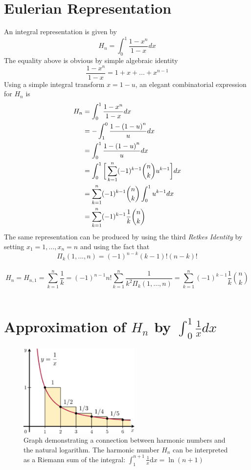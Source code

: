 \documentclass[2pt]{article}
\begin{document}
\section{Eulerian Representation}
An integral representation is given by
\begin{equation}
H_{n} = \int_{0}^{1} \frac{1-x^n}{1-x} dx \label{Euler equation}\nonumber
\end{equation}
The equality above is obvious by simple algebraic identity
\begin{equation}
\frac{1-x^n}{1-x} = 1+x+...+x^{n-1}\nonumber
\end{equation}
Using a simple integral transform ${x = 1-u}$, an elegant combinatorial expression for $H_{n}$ is\\
\begin{align}
H_{n} &= \int_{0}^{1} \frac{1-x^n}{1-x} dx\nonumber \\
	 &= -\int_{1}^{0} \frac{1-{(1-u)}^n}{u} dx \nonumber \\
	 &= \int_{0}^{1} \frac{1-{(1-u)}^n}{u} dx \nonumber \\
	 &= \int_{0}^{1} \bigg{[}\sum_{k=1}^{n} (-1)^{k-1} {n \choose k} u^{k-1}\bigg{]}dx \nonumber \\
	 &= \sum_{k=1}^{n} (-1)^{k-1} {n \choose k} \int_{0}^{1} u^{k-1} \nonumber dx\\
	 &= \sum_{k=1}^{n} (-1)^{k-1} \frac{1}{k} {n \choose k} \nonumber
\end{align}
The same representation can be produced by using the third \emph{Retkes Identity} by setting $x_{1} = 1, . . . , x_{n} = n$ and using the fact that
\begin{equation}
{\Pi}_{k}(1, . . . , n) = {(-1)}^{n-k} (k-1)!(n-k)! \nonumber
\end{equation}
\\
\begin{equation}
H_{n}=H_{n,1}=\sum_{k=1}^{n} \frac{1}{k} = {(-1)}^{n-1}n!\sum_{k=1}^{n}\frac{1}{k^{2}{\Pi}_{k}(1, . . . ,n)}=\sum_{k=1}^{n}{(-1)}^{k-1}\frac{1}{k}{n \choose k} \nonumber
\end{equation}
\\
\section{Approximation of $H_{n}$ by $\int_{0}^{1}\frac{1}{x} dx$}
\begin{figure}
\includegraphics[width=6cm, natwidth=570, natheight=436]{2.eps}
\caption{\small{Graph demonstrating a connection between harmonic numbers and the natural logarithm. The harmonic number $H_{n}$ can be interpreted as a Riemann sum of the integral: $\int_1^{n+1} \frac{1}{x} \mathrm{d}x = \ln(n+1)$}}
\end{figure}
\end{document}
